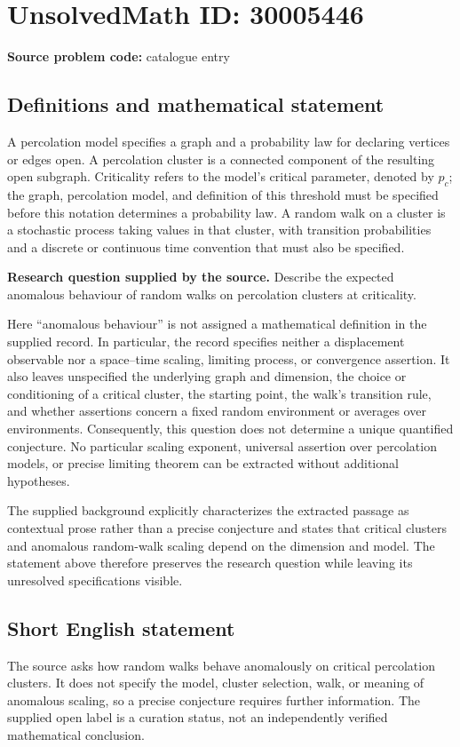\documentclass[11pt]{article}
\begin{document}
\section*{UnsolvedMath ID: 30005446}
\textbf{Source problem code:} catalogue entry
\subsection{Definitions and mathematical statement}
A percolation model specifies a graph and a probability law for declaring vertices or edges open. A percolation cluster is a connected component of the resulting open subgraph. Criticality refers to the model's critical parameter, denoted by \(p_c\); the graph, percolation model, and definition of this threshold must be specified before this notation determines a probability law. A random walk on a cluster is a stochastic process taking values in that cluster, with transition probabilities and a discrete or continuous time convention that must also be specified.

\textbf{Research question supplied by the source.} Describe the expected anomalous behaviour of random walks on percolation clusters at criticality.

Here ``anomalous behaviour'' is not assigned a mathematical definition in the supplied record. In particular, the record specifies neither a displacement observable nor a space--time scaling, limiting process, or convergence assertion. It also leaves unspecified the underlying graph and dimension, the choice or conditioning of a critical cluster, the starting point, the walk's transition rule, and whether assertions concern a fixed random environment or averages over environments. Consequently, this question does not determine a unique quantified conjecture. No particular scaling exponent, universal assertion over percolation models, or precise limiting theorem can be extracted without additional hypotheses.

The supplied background explicitly characterizes the extracted passage as contextual prose rather than a precise conjecture and states that critical clusters and anomalous random-walk scaling depend on the dimension and model. The statement above therefore preserves the research question while leaving its unresolved specifications visible.
\subsection{Short English statement}
The source asks how random walks behave anomalously on critical percolation clusters. It does not specify the model, cluster selection, walk, or meaning of anomalous scaling, so a precise conjecture requires further information. The supplied open label is a curation status, not an independently verified mathematical conclusion.
\end{document}
